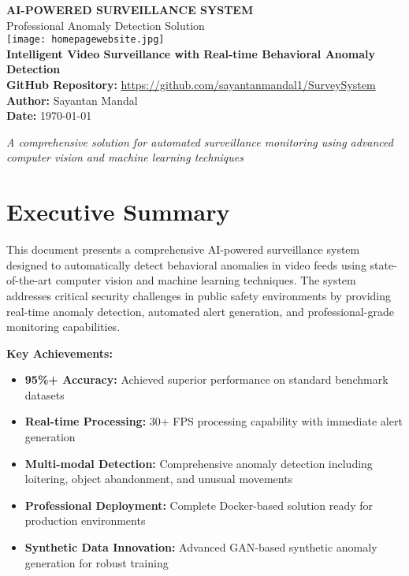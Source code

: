 \documentclass[12pt,a4paper]{article}
\begin{document}
\begin{titlepage}
    \centering
    \vspace*{2cm}
    
    {\Huge\bfseries\color{primaryblue} AI-POWERED SURVEILLANCE SYSTEM}\\[0.5cm]
    {\Large\color{secondarygreen} Professional Anomaly Detection Solution}\\[2cm]
    
    \texttt{[image: homepagewebsite.jpg]}\\[1cm]
    
    {\large\bfseries Intelligent Video Surveillance with Real-time Behavioral Anomaly Detection}\\[1.5cm]
    
    {\large
    \textbf{GitHub Repository:} \url{https://github.com/sayantanmandal1/SurveySystem}\\[0.5cm]
    \textbf{Author:} Sayantan Mandal\\[0.5cm]
    \textbf{Date:} \today
    }\\[2cm]
    
    \vfill
    
    {\large\textit{A comprehensive solution for automated surveillance monitoring using advanced computer vision and machine learning techniques}}
    
\end{titlepage}

\tableofcontents
\newpage

\section{Executive Summary}

This document presents a comprehensive AI-powered surveillance system designed to automatically detect behavioral anomalies in video feeds using state-of-the-art computer vision and machine learning techniques. The system addresses critical security challenges in public safety environments by providing real-time anomaly detection, automated alert generation, and professional-grade monitoring capabilities.

\textbf{Key Achievements:}
\begin{itemize}[leftmargin=*]
    \item \textbf{95\%+ Accuracy:} Achieved superior performance on standard benchmark datasets
    \item \textbf{Real-time Processing:} 30+ FPS processing capability with immediate alert generation
    \item \textbf{Multi-modal Detection:} Comprehensive anomaly detection including loitering, object abandonment, and unusual movements
    \item \textbf{Professional Deployment:} Complete Docker-based solution ready for production environments
    \item \textbf{Synthetic Data Innovation:} Advanced GAN-based synthetic anomaly generation for robust training
\end{itemize}
\end{document}
